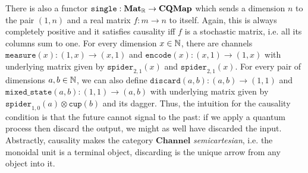 There is also a functor $\mathtt{single} : \mathbf{Mat}_{\mathbb{R}} \to \mathbf{CQMap}$ which sends a dimension $n$ to the pair $(1, n)$ and a real matrix $f : m \to n$ to itself.
Again, this is always completely positive and it satisfies causality iff $f$ is a stochastic matrix, i.e. all its columns sum to one.
For every dimension $x \in \mathbb{N}$, there are channels $\mathtt{measure}(x) : (1, x) \to (x, 1)$ and $\mathtt{encode}(x) : (x, 1) \to (1, x)$ with underlying matrix given by $\mathtt{spider}_{2, 1}(x)$ and $\mathtt{spider}_{2, 1}(x)$.
For every pair of dimensions $a, b \in \mathbb{N}$, we can also define $\mathtt{discard}(a, b) : (a, b) \to (1, 1)$ and $\mathtt{mixed\_state}(a, b) : (1, 1) \to (a, b)$ with underlying matrix given by $\mathtt{spider}_{1, 0}(a) \otimes \mathtt{cup}(b)$ and its dagger.
Thus, the intuition for the causality condition is that the future cannot signal to the past: if we apply a quantum process then discard the output, we might as well have discarded the input.
Abstractly, causality makes the category $\mathbf{Channel}$ \emph{semicartesian}, i.e. the monoidal unit is a terminal object, discarding is the unique arrow from any object into it.

